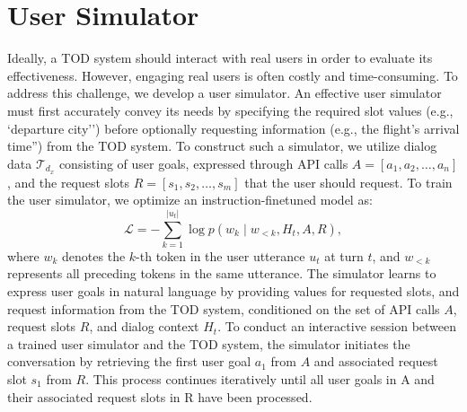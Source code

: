 

\section{User Simulator}

Ideally, a TOD system should interact with real users in order to evaluate its effectiveness. However, engaging real users is often costly and time-consuming. To address this challenge, we develop a user simulator. An effective user simulator must first accurately convey its needs by specifying the required slot values (e.g., `departure city'') before optionally requesting information (e.g., the flight's arrival time'') from the TOD system. 
To construct such a simulator, we utilize dialog data \( \mathcal{T}_{d_x} \)  consisting of user goals, expressed through API calls \( A = [a_1, a_2, \dots, a_n] \), and the request slots  \( R =  [s_1, s_2, \dots, s_m] \) that the user should request. 
To train the user simulator, we optimize an instruction-finetuned model as:
\vspace{-4pt}
\[
\mathcal{L} = - \sum_{k=1}^{|u_t|} \log p(w_k \mid w_{<k}, H_t, A, R),
\]
where \( w_k \) denotes the \( k \)-th token in the user utterance \( u_t \) at turn \(t\), and \( w_{<k} \) represents all preceding tokens in the same utterance. 
The simulator learns to express user goals in natural language by providing values for requested slots, and request information from the TOD system, conditioned on the set of API calls \(A\), request slots \(R\), and dialog context \(H_t\).
To conduct an interactive session between a trained user simulator and the TOD system, the simulator initiates the conversation by retrieving the first user goal \( a_1 \) from \(A\) and associated request slot \( s_1 \) from \(R\).
This process continues iteratively until all user goals in 
A and their associated request slots in R have been processed.

